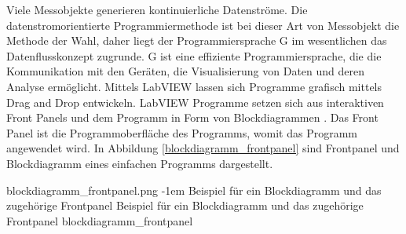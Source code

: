 Viele Messobjekte generieren kontinuierliche Datenströme. Die datenstromorientierte Programmiermethode ist bei dieser Art von Messobjekt die Methode der Wahl, daher liegt der Programmiersprache G im wesentlichen das Datenflusskonzept zugrunde. G ist eine effiziente Programmiersprache, die die Kommunikation mit den Geräten, die Visualisierung von Daten und deren Analyse ermöglicht. Mittels LabVIEW lassen sich Programme grafisch mittels Drag and Drop entwickeln. LabVIEW Programme setzen sich aus interaktiven Front Panels und dem Programm in Form von Blockdiagrammen \cite{kodosky}. Das Front Panel ist die Programmoberfläche des Programms, womit das Programm angewendet wird. In Abbildung \ref{blockdiagramm_frontpanel} sind Frontpanel und Blockdiagramm eines einfachen Programms dargestellt.

{blockdiagramm_frontpanel.png}
{-1em}
{Beispiel für ein Blockdiagramm und das zugehörige Frontpanel}
{Beispiel für ein Blockdiagramm und das zugehörige Frontpanel \cite{blockdiagramm_frontpanel}}
{blockdiagramm_frontpanel}